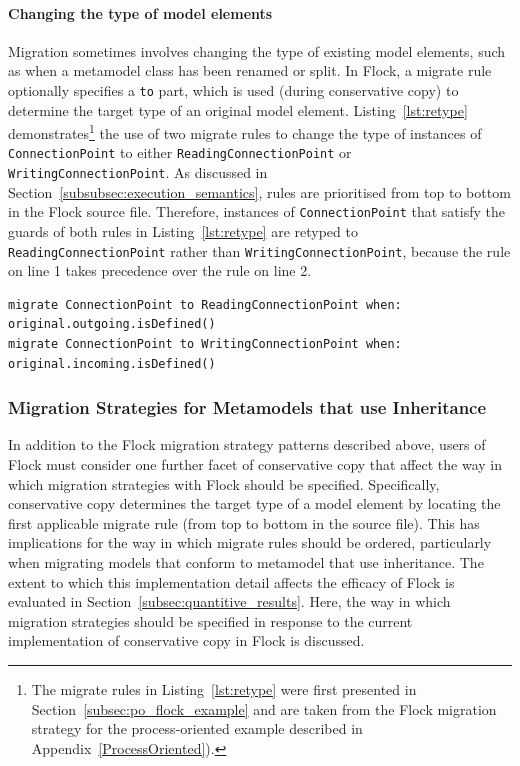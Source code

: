 \paragraph{Changing the type of model elements} Migration sometimes involves changing the type of existing model elements, such as when a metamodel class has been renamed or split. In Flock, a migrate rule optionally specifies a \texttt{to} part, which is used (during conservative copy) to determine the target type of an original model element. Listing~\ref{lst:retype} demonstrates\footnote{The migrate rules in Listing~\ref{lst:retype} were first presented in Section~\ref{subsec:po_flock_example} and are taken from the Flock migration strategy for the process-oriented example described in Appendix~\ref{ProcessOriented}).} the use of two migrate rules to change the type of instances of \texttt{ConnectionPoint} to either \texttt{Re\-ad\-i\-ngCo\-nn\-ec\-ti\-onPo\-i\-nt} or \texttt{Wr\-it\-i\-ngCo\-nn\-ec\-ti\-onPo\-i\-nt}. As discussed in Section~\ref{subsubsec:execution_semantics}, rules are prioritised from top to bottom in the Flock source file. Therefore, instances of \texttt{Co\-nn\-ec\-ti\-onPo\-i\-nt} that satisfy the guards of both rules in Listing~\ref{lst:retype} are retyped to \texttt{Re\-ad\-i\-ngCo\-nn\-ec\-ti\-onPo\-i\-nt} rather than \texttt{Wr\-it\-i\-ngCo\-nn\-ec\-ti\-onPo\-i\-nt}, because the rule on line 1 takes precedence over the rule on line 2.

\begin{lstlisting}[float=tbp, caption=Redefining equivalences for the Component model migration., label=lst:retype, language=Flock]
migrate ConnectionPoint to ReadingConnectionPoint when: original.outgoing.isDefined()
migrate ConnectionPoint to WritingConnectionPoint when: original.incoming.isDefined()
\end{lstlisting}


\subsubsection{Migration Strategies for Metamodels that use Inheritance}
In addition to the Flock migration strategy patterns described above, users of Flock must consider one further facet of conservative copy that affect the way in which migration strategies with Flock should be specified. Specifically, conservative copy determines the target type of a model element by locating the first applicable migrate rule (from top to bottom in the source file). This has implications for the way in which migrate rules should be ordered, particularly when migrating models that conform to metamodel that use inheritance. The extent to which this implementation detail affects the efficacy of Flock is evaluated in Section~\ref{subsec:quantitive_results}. Here, the way in which migration strategies should be specified in response to the current implementation of conservative copy in Flock is discussed.

